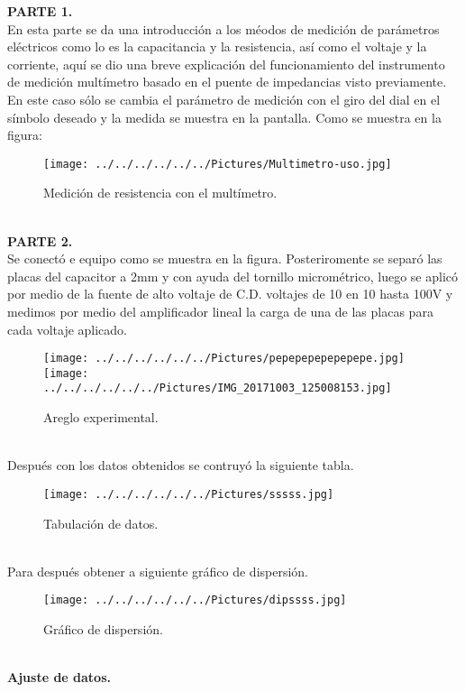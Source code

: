 \documentclass[11pt,a4paper]{article}
\begin{document}
\textbf{PARTE 1.}\\
En esta parte se da una introducci\'{o}n a los m\'{e}odos de medici\'{o}n de par\'{a}metros el\'{e}ctricos como lo es la capacitancia y la resistencia, as\'{i} como el voltaje y la corriente, aqu\'{i} se dio una breve explicaci\'{o}n del funcionamiento del instrumento de medici\'{o}n mult\'{i}metro basado en el puente de impedancias visto previamente. En este caso s\'{o}lo se cambia el par\'{a}metro de medici\'{o}n con el giro del dial en el s\'{i}mbolo deseado y la medida se muestra en la pantalla. Como se muestra en la figura: 
\\
\begin{figure}[hbtp]
\centering
\texttt{[image: ../../../../../../Pictures/Multimetro-uso.jpg]}
\caption{Medici\'{o}n de resistencia con el mult\'{i}metro.}
\end{figure}
\\
\textbf{PARTE 2.}
\\
Se conect\'{o} e equipo como se muestra en la figura. Posteriromente se separ\'{o} las placas del capacitor a 2mm  y con ayuda del tornillo microm\'{e}trico, luego se aplic\'{o} por medio de la fuente de alto voltaje de C.D. voltajes de 10 en 10 hasta 100V y medimos por medio del amplificador lineal la carga de una de las placas para cada voltaje aplicado.
\begin{figure}[hbtp]
\centering
\texttt{[image: ../../../../../../Pictures/pepepepepepepepe.jpg]} 
\texttt{[image: ../../../../../../Pictures/IMG\_20171003\_125008153.jpg]} 
\caption{Areglo experimental.}
\end{figure}
\\
Despu\'{e}s con los datos obtenidos se contruy\'{o} la siguiente tabla. 
\begin{figure}[hbtp]
\centering
\texttt{[image: ../../../../../../Pictures/sssss.jpg]}
\caption{Tabulaci\'{o}n de datos.}
\end{figure}
\\
Para despu\'{e}s obtener a siguiente gr\'{a}fico de dispersi\'{o}n.
\\
\begin{figure}[hbtp]
\centering
\texttt{[image: ../../../../../../Pictures/dipssss.jpg]}
\caption{Gr\'{a}fico de dispersi\'{o}n.}
\end{figure}
\\
\textbf{Ajuste de datos.} 
\end{document}
